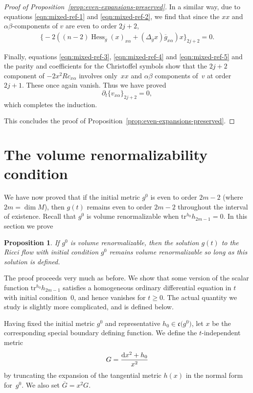 \documentclass[pdftex]{sigma}
\numberwithin{equation}{section}
\newtheorem{Proposition}[Theorem]{Proposition}
 { \theoremstyle{definition}
\newtheorem{Definition}[Theorem]{Definition}
\newtheorem{Example}[Theorem]{Example}
\newtheorem{Remark}[Theorem]{Remark} }
\newcommand{\olg}{\overline{g}}
\newcommand{\olG}{\overline{G}}
\newcommand{\frakc}{\mathfrak c}
\newcommand{\gin}{{g^0}}
\newcommand{\tr}{\mathrm{tr}}
\DeclareMathOperator{\hess}{Hess}
\begin{document}
\begin{proof}[Proof of Proposition~\ref{prop:even-expansions-preserved}]
In a similar way, due to equations \eqref{eqn:mixed-ref-1} and \eqref{eqn:mixed-ref-2}, we find that since the $xx$ and $\alpha \beta$-components of $v$ are even to order $2j+2$,
\begin{gather*} \big\{ {-}2 ( (n-2) \hess_{\olg} (x)_{x\alpha} + (\Delta_{\olg} x) \olg_{x \alpha} ) x\big\}_{2j+2} = 0.
\end{gather*}

Finally, equations \eqref{eqn:mixed-ref-3}, \eqref{eqn:mixed-ref-4} and \eqref{eqn:mixed-ref-5} and the parity and coefficients for the Christoffel symbols show that the $2j+2$ component of $-2 x^2 Rc_{x\alpha}$ involves only~$xx$ and $\alpha \beta$ components of~$v$ at order~$2j+1$. These once again vanish. Thus we have proved
\[ \partial_t \{v_{x \alpha}\}_{2j+2} = 0, \]
which completes the induction.

This concludes the proof of Proposition~\ref{prop:even-expansions-preserved}.
\end{proof}

\section{The volume renormalizability condition} \label{VRandRF}

We have now proved that if the initial metric $\gin$ is even to order $2m-2$ (where $2m = \dim M$), then $g(t)$ remains even to order $2m-2$ throughout the interval of existence. Recall that $\gin$ is volume renormalizable when $\tr^{h_0} h_{2m-1} = 0$. In this section we prove
\begin{Proposition} \label{prop:volume-renorm-preserved}If $\gin$ is volume renormalizable, then the solution $g(t)$ to the Ricci flow with initial condition $\gin$ remains volume renormalizable so long as this solution is defined.
\end{Proposition}

The proof proceeds very much as before. We show that some version of the scalar function $\tr^{h_0} h_{2m-1}$ satisfies a homogeneous ordinary differential equation in $t$ with initial condition~$0$, and hence vanishes for $t \geq 0$. The actual quantity we study is slightly more complicated, and is defined below.

Having fixed the initial metric $\gin$ and representative $h_0 \in \frakc\big(\gin\big)$, let $x$ be the corresponding special boundary defining function. We define the $t$-independent metric
\begin{gather*}%
G = \frac{{\rm d}x^2 + h_0}{x^2}
\end{gather*}
by truncating the expansion of the tangential metric $h(x)$ in the normal form for~$\gin$. We also set $\olG = x^2 G$.
\end{document}
